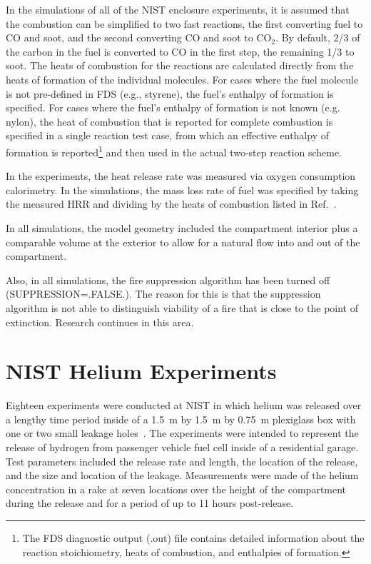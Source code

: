 In the simulations of all of the NIST enclosure experiments, it is assumed that the combustion can be simplified to two fast reactions, the first converting fuel to CO and soot, and the second converting CO and soot to CO$_2$. By default, 2/3 of the carbon in the fuel is converted to CO in the first step, the remaining 1/3 to soot. The heats of combustion for the reactions are calculated directly from the heats of formation of the individual molecules. For cases where the fuel molecule is not pre-defined in FDS (e.g., styrene), the fuel's enthalpy of formation is specified. For cases where the fuel's enthalpy of formation is not known (e.g. nylon), the heat of combustion that is reported for complete combustion is specified in a single reaction test case, from which an effective enthalpy of formation is reported\footnote{The FDS diagnostic output (.out) file contains detailed information about the reaction stoichiometry, heats of combustion, and enthalpies of formation.} and then used in the actual two-step reaction scheme.

In the experiments, the heat release rate was measured via oxygen consumption calorimetry. In the simulations, the mass loss rate of fuel was specified by taking the measured HRR and dividing by the heats of combustion listed in Ref.~\cite{SFPE:Tewarson}.

In all simulations, the model geometry included the compartment interior plus a comparable volume at the exterior to allow for a natural flow into and out of the compartment.

Also, in all simulations, the fire suppression algorithm has been turned off ({\ct SUPPRESSION=.FALSE.}). The reason for this is that the suppression algorithm is not able to distinguish viability of a fire that is close to the point of extinction. Research continues in this area.


\FloatBarrier


\section{NIST Helium Experiments}
\label{NIST_Helium_Description}

Eighteen experiments were conducted at NIST in which helium was released over a lengthy time period inside of a 1.5~m by 1.5~m by 0.75~m plexiglass box with one or two small leakage holes~\cite{Pitts:2011}. The experiments were intended to represent the release of hydrogen from passenger vehicle fuel cell inside of a residential garage. Test parameters included the release rate and length, the location of the release, and the size and location of the leakage. Measurements were made of the helium concentration in a rake at seven locations over the height of the compartment during the release and for a period of up to 11 hours post-release.

